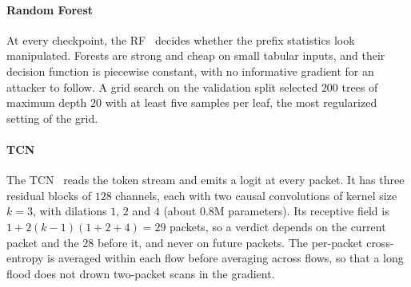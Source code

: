 \documentclass[acmtog,nonacm,pbalance]{acmart}
\begin{document}
\paragraph{Random Forest} At every checkpoint, the RF~\cite{breiman2001random}
decides whether the prefix statistics look manipulated. Forests are strong and
cheap on small tabular inputs, and their decision function is piecewise
constant, with no informative gradient for an attacker to follow. A grid search
on the validation split selected $200$ trees of maximum depth $20$ with at least
five samples per leaf, the most regularized setting of the grid.

\paragraph{TCN} The TCN~\cite{bai2018empirical} reads the token stream and emits
a logit at every packet. It has three residual blocks of $128$ channels, each
with two causal convolutions of kernel size $k=3$, with dilations $1$, $2$ and
$4$ (about $0.8$M parameters). Its receptive field is
$1 + 2(k-1)(1+2+4) = 29$ packets, so a verdict depends on the current packet and
the $28$ before it, and never on future packets. The per-packet cross-entropy is
averaged within each flow before averaging across flows, so that a long flood
does not drown two-packet scans in the gradient.
\end{document}
